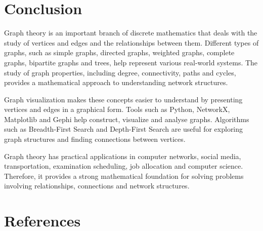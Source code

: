 \documentclass[12pt,a4paper]{article}
\begin{document}

\section{Conclusion}

Graph theory is an important branch of discrete mathematics
that deals with the study of vertices and edges and the
relationships between them. Different types of graphs, such
as simple graphs, directed graphs, weighted graphs, complete
graphs, bipartite graphs and trees, help represent various
real-world systems. The study of graph properties, including
degree, connectivity, paths and cycles, provides a mathematical
approach to understanding network structures.

Graph visualization makes these concepts easier to understand
by presenting vertices and edges in a graphical form. Tools
such as Python, NetworkX, Matplotlib and Gephi help construct,
visualize and analyse graphs. Algorithms such as Breadth-First
Search and Depth-First Search are useful for exploring graph
structures and finding connections between vertices.

Graph theory has practical applications in computer networks,
social media, transportation, examination scheduling, job
allocation and computer science. Therefore, it provides a
strong mathematical foundation for solving problems involving
relationships, connections and network structures.


\section{References}
\end{document}
